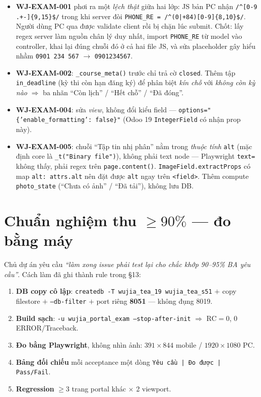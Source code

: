 \begin{itemize}
  \item \textbf{WJ-EXAM-001} phơi ra một \emph{lệch thật} giữa hai lớp: JS bản PC nhận
    \texttt{/\^{}[0-9 .+-]\{9,15\}\$/} trong khi server đòi
    \texttt{PHONE\_RE = /\^{}(0|+84)[0-9]\{8,10\}\$/}. Người dùng PC qua được validate client rồi
    bị chặn lúc submit. Chốt: lấy regex server làm nguồn chân lý duy nhất, import
    \texttt{PHONE\_RE} từ model vào controller, khai lại đúng chuỗi đó ở cả hai file JS, và sửa
    placeholder gây hiểu nhầm \texttt{0901 234 567} $\rightarrow$ \texttt{0901234567}.
  \item \textbf{WJ-EXAM-002}: \texttt{\_course\_meta()} trước chỉ trả cờ \texttt{closed}. Thêm
    tập \texttt{in\_deadline} (kỳ thi còn hạn đăng ký) để phân biệt \emph{kín chỗ} với
    \emph{không còn kỳ nào} $\Rightarrow$ ba nhãn ``Còn lịch'' / ``Hết chỗ'' / ``Đã đóng''.
  \item \textbf{WJ-EXAM-004}: sửa \emph{view}, không đổi kiểu field ---
    \texttt{options="\{'enable\_formatting': false\}"} (Odoo 19 \texttt{IntegerField} có nhận
    prop này).
  \item \textbf{WJ-EXAM-005}: chuỗi ``Tập tin nhị phân'' nằm trong \emph{thuộc tính}
    \texttt{alt} (mặc định core là \texttt{\_t("Binary file")}), không phải text node ---
    Playwright \texttt{text=} không thấy, phải regex trên \texttt{page.content()}.
    \texttt{ImageField.extractProps} có map \texttt{alt: attrs.alt} nên đặt được
    \texttt{alt} ngay trên \texttt{<field>}. Thêm compute \texttt{photo\_state}
    (``Chưa có ảnh'' / ``Đã tải''), không lưu DB.
\end{itemize}

\section{Chuẩn nghiệm thu $\ge90\%$ --- đo bằng máy}

Chủ dự án yêu cầu \emph{``làm xong issue phải test lại cho chắc khớp 90--95\% BA yêu cầu''}.
Cách làm đã ghi thành rule trong §13:

\begin{enumerate}
  \item \textbf{DB copy cô lập}: \texttt{createdb -T wujia\_tea\_19 wujia\_tea\_s51} $+$ copy
    filestore $+$ \texttt{--db-filter} $+$ port riêng \textbf{8051} --- không đụng 8019.
  \item \textbf{Build sạch}: \texttt{-u wujia\_portal\_exam --stop-after-init} $\Rightarrow$
    RC$=$0, 0 ERROR/Traceback.
  \item \textbf{Đo bằng Playwright}, không nhìn ảnh: $391\times844$ mobile / $1920\times1080$ PC.
  \item \textbf{Bảng đối chiếu} mỗi acceptance một dòng \texttt{Yêu cầu | Đo được | Pass/Fail}.
  \item \textbf{Regression} $\ge3$ trang portal khác $\times$ 2 viewport.
\end{enumerate}

